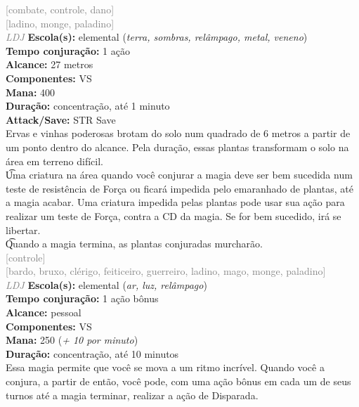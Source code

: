 \documentclass{RPG_Adventure}[2021/10/20]
\begin{document}
{\scriptsize \textcolor{gray}{[combate, controle, dano]\\}}
{\scriptsize \textcolor{gray}{[ladino, monge, paladino]\\}}
{\tiny \textcolor{gray}{\textit{LDJ}}}
{\small \t \textbf{Escola(s):} elemental (\textit{terra, sombras, relâmpago, metal, veneno})\\\t \textbf{Tempo conjuração:} 1 ação\\\t \textbf{Alcance:} 27 metros\\\t \textbf{Componentes:} VS\\\t \textbf{Mana:} 400\\\t \textbf{Duração:} concentração, até 1 minuto\\\t \textbf{Attack/Save:} STR Save\\}
{\normalsize Ervas e vinhas poderosas brotam do solo num quadrado de 6 metros a partir de um ponto dentro do alcance. Pela duração, essas plantas transformam o solo na área em terreno difícil.\\\t Uma criatura na área quando você conjurar a magia deve ser bem sucedida num teste de resistência de Força ou ficará impedida pelo emaranhado de plantas, até a magia acabar. Uma criatura impedida pelas plantas pode usar sua ação para realizar um teste de Força, contra a CD da magia. Se for bem sucedido, irá se libertar.\\\t Quando a magia termina, as plantas conjuradas murcharão.\\}
{\scriptsize \textcolor{gray}{[controle]\\}}
{\scriptsize \textcolor{gray}{[bardo, bruxo, clérigo, feiticeiro, guerreiro, ladino, mago, monge, paladino]\\}}
{\tiny \textcolor{gray}{\textit{LDJ}}}
{\small \t \textbf{Escola(s):} elemental (\textit{ar, luz, relâmpago})\\\t \textbf{Tempo conjuração:} 1 ação bônus\\\t \textbf{Alcance:} pessoal\\\t \textbf{Componentes:} VS\\\t \textbf{Mana:} 250 (\textit{+ 10 por minuto})\\\t \textbf{Duração:} concentração, até 10 minutos\\}
{\normalsize Essa magia permite que você se mova a um ritmo incrível. Quando você a conjura, a partir de então, você pode, com uma ação bônus em cada um de seus turnos até a magia terminar, realizar a ação de Disparada.\\}
\end{document}
